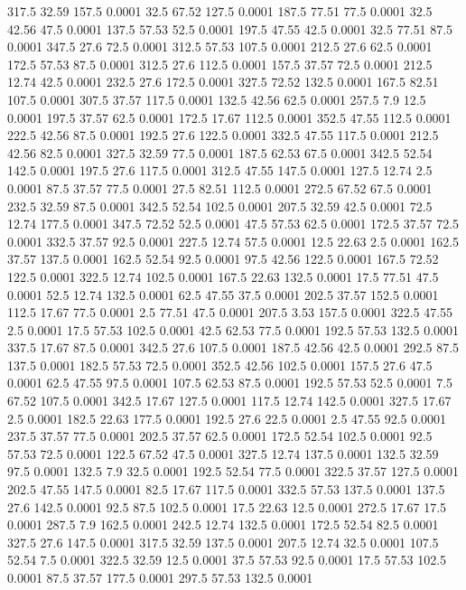 317.5	32.59	157.5	0.0001
32.5	67.52	127.5	0.0001
187.5	77.51	77.5	0.0001
32.5	42.56	47.5	0.0001
137.5	57.53	52.5	0.0001
197.5	47.55	42.5	0.0001
32.5	77.51	87.5	0.0001
347.5	27.6	72.5	0.0001
312.5	57.53	107.5	0.0001
212.5	27.6	62.5	0.0001
172.5	57.53	87.5	0.0001
312.5	27.6	112.5	0.0001
157.5	37.57	72.5	0.0001
212.5	12.74	42.5	0.0001
232.5	27.6	172.5	0.0001
327.5	72.52	132.5	0.0001
167.5	82.51	107.5	0.0001
307.5	37.57	117.5	0.0001
132.5	42.56	62.5	0.0001
257.5	7.9	12.5	0.0001
197.5	37.57	62.5	0.0001
172.5	17.67	112.5	0.0001
352.5	47.55	112.5	0.0001
222.5	42.56	87.5	0.0001
192.5	27.6	122.5	0.0001
332.5	47.55	117.5	0.0001
212.5	42.56	82.5	0.0001
327.5	32.59	77.5	0.0001
187.5	62.53	67.5	0.0001
342.5	52.54	142.5	0.0001
197.5	27.6	117.5	0.0001
312.5	47.55	147.5	0.0001
127.5	12.74	2.5	0.0001
87.5	37.57	77.5	0.0001
27.5	82.51	112.5	0.0001
272.5	67.52	67.5	0.0001
232.5	32.59	87.5	0.0001
342.5	52.54	102.5	0.0001
207.5	32.59	42.5	0.0001
72.5	12.74	177.5	0.0001
347.5	72.52	52.5	0.0001
47.5	57.53	62.5	0.0001
172.5	37.57	72.5	0.0001
332.5	37.57	92.5	0.0001
227.5	12.74	57.5	0.0001
12.5	22.63	2.5	0.0001
162.5	37.57	137.5	0.0001
162.5	52.54	92.5	0.0001
97.5	42.56	122.5	0.0001
167.5	72.52	122.5	0.0001
322.5	12.74	102.5	0.0001
167.5	22.63	132.5	0.0001
17.5	77.51	47.5	0.0001
52.5	12.74	132.5	0.0001
62.5	47.55	37.5	0.0001
202.5	37.57	152.5	0.0001
112.5	17.67	77.5	0.0001
2.5	77.51	47.5	0.0001
207.5	3.53	157.5	0.0001
322.5	47.55	2.5	0.0001
17.5	57.53	102.5	0.0001
42.5	62.53	77.5	0.0001
192.5	57.53	132.5	0.0001
337.5	17.67	87.5	0.0001
342.5	27.6	107.5	0.0001
187.5	42.56	42.5	0.0001
292.5	87.5	137.5	0.0001
182.5	57.53	72.5	0.0001
352.5	42.56	102.5	0.0001
157.5	27.6	47.5	0.0001
62.5	47.55	97.5	0.0001
107.5	62.53	87.5	0.0001
192.5	57.53	52.5	0.0001
7.5	67.52	107.5	0.0001
342.5	17.67	127.5	0.0001
117.5	12.74	142.5	0.0001
327.5	17.67	2.5	0.0001
182.5	22.63	177.5	0.0001
192.5	27.6	22.5	0.0001
2.5	47.55	92.5	0.0001
237.5	37.57	77.5	0.0001
202.5	37.57	62.5	0.0001
172.5	52.54	102.5	0.0001
92.5	57.53	72.5	0.0001
122.5	67.52	47.5	0.0001
327.5	12.74	137.5	0.0001
132.5	32.59	97.5	0.0001
132.5	7.9	32.5	0.0001
192.5	52.54	77.5	0.0001
322.5	37.57	127.5	0.0001
202.5	47.55	147.5	0.0001
82.5	17.67	117.5	0.0001
332.5	57.53	137.5	0.0001
137.5	27.6	142.5	0.0001
92.5	87.5	102.5	0.0001
17.5	22.63	12.5	0.0001
272.5	17.67	17.5	0.0001
287.5	7.9	162.5	0.0001
242.5	12.74	132.5	0.0001
172.5	52.54	82.5	0.0001
327.5	27.6	147.5	0.0001
317.5	32.59	137.5	0.0001
207.5	12.74	32.5	0.0001
107.5	52.54	7.5	0.0001
322.5	32.59	12.5	0.0001
37.5	57.53	92.5	0.0001
17.5	57.53	102.5	0.0001
87.5	37.57	177.5	0.0001
297.5	57.53	132.5	0.0001
